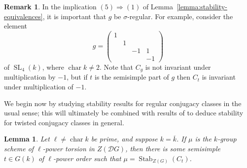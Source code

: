 \documentclass[11pt,reqno]{amsart}
\newtheorem{lemma}[theorem]{Lemma}
\theoremstyle{definition}
\newtheorem{remark}[theorem]{Remark}
\newcommand{\sD}{{\mathscr D}}
\DeclareMathOperator{\chara}{char}
\DeclareMathOperator{\SL}{SL}
\DeclareMathOperator{\Stab}{Stab}
\newcommand{\ov}[1]{\overline{#1}}
\begin{document}
\begin{remark}\label{rmk:stability-non-reg}
    In the implication $(5) \Rightarrow (1)$ of Lemma~\ref{lemma:stability-equivalences}, it is important that $g$ be $\sigma$-regular. For example, consider the element
    \[
    g = \begin{pmatrix}
        1 & & & \\
          &1 & & \\
          & &-1 &1 \\
          & & &-1
    \end{pmatrix}
    \]
    of $\SL_4(k)$, where $\chara k \neq 2$. Note that $C_g$ is not invariant under multiplication by $-1$, but if $t$ is the semisimple part of $g$ then $C_t$ is invariant under multiplication of $-1$.

\end{remark}

We begin now by studying stability results for regular conjugacy classes in the usual sense; this will ultimately be combined with results of \cite{Springer-twisted} to deduce stability for twisted conjugacy classes in general.

\begin{lemma}\label{lemma:stabilizing-prime-power}
    Let $\ell \neq \chara k$ be prime, and suppose $k = \ov{k}$. If $\mu$ is the $k$-group scheme of $\ell$-power torsion in $Z(\sD G)$, then there is some semisimple $t \in G(k)$ of $\ell$-power order such that $\mu = \Stab_{Z(G)}(C_t)$.
\end{lemma}
\end{document}
